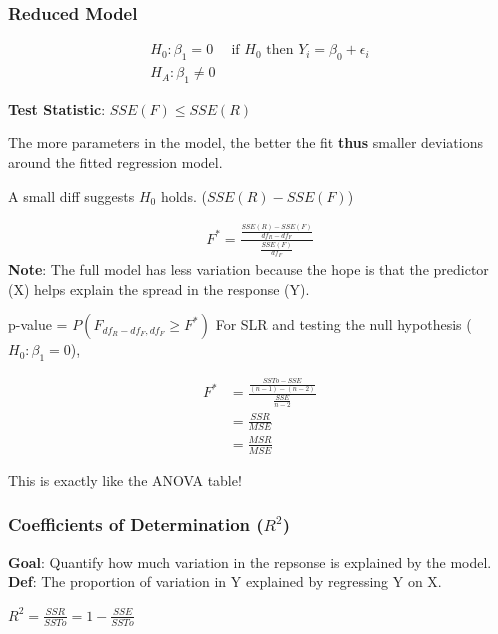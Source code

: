 \documentclass[11pt]{article}
\begin{document}
\subsubsection{Reduced Model}
\label{sec:org41d58f8}
\begin{equation}
\begin{split}
H_0: \beta_1 = 0 & \text{ if $H_0$ then $Y_i = \beta_0 + \epsilon_i$} \\
H_A: \beta_1 \neq 0 &
\end{split}
\end{equation}

\textbf{Test Statistic}: \(SSE(F) \leq SSE(R)\)

The more parameters in the model, the better the fit \textbf{thus} smaller deviations
around the fitted regression model.

A small diff suggests \(H_0\) holds. (\(SSE(R) - SSE(F)\))

\begin{equation}
\begin{split}
F^* = \frac{\frac{SSE(R) - SSE(F)}{df_R - df_F}}{\frac{SSE(F)}{df_F}}
\end{split}
\end{equation}
\textbf{Note}: The full model has less variation because the hope is that the predictor
 (X) helps explain the spread in the response (Y).

p-value = \(P(F_{df_R - df_F, df_F} \geq F^*)\)
For SLR and testing the null hypothesis (\(H_0: \beta_1 = 0\)),

\begin{equation}
\begin{split}
F^* & = \frac{\frac{SSTo - SSE}{(n - 1) - (n - 2)}}{\frac{SSE}{n - 2}}\\
& = \frac{SSR}{MSE}\\
& = \frac{MSR}{MSE}
\end{split}
\end{equation}

This is exactly like the ANOVA table!

\subsubsection{Coefficients of Determination (\(R^2\))}
\label{sec:org2c6a7eb}

\textbf{Goal}: Quantify how much variation in the repsonse is explained by the model.
\textbf{Def}: The proportion of variation in Y explained by regressing Y on X.

\(R^2 =\frac{SSR}{SSTo} = 1 - \frac{SSE}{SSTo}\)
\end{document}
